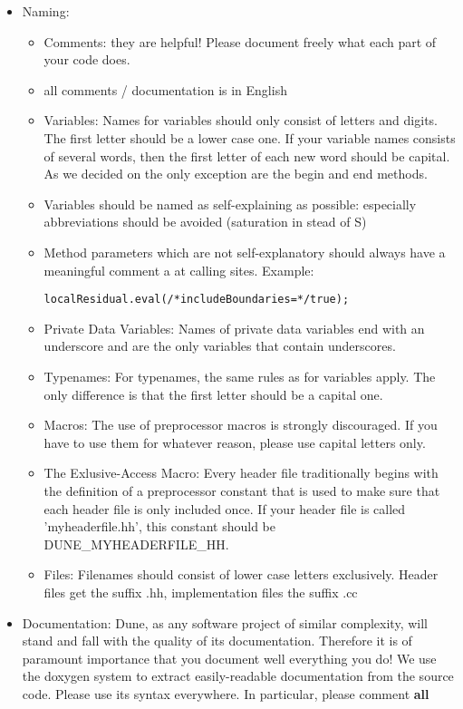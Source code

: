 \begin{itemize}
\item Naming: 
\begin{itemize}
\item Comments: they are helpful! Please document freely what each part of your code does. 
\item all comments / documentation is in English
\item Variables: Names for variables should only consist of letters and digits. The first letter should be a lower case one. If your variable names consists of several words, then the first letter of each new word should be capital. As we decided on the only exception are the begin and end methods.
\item Variables should be named as self-explaining as possible: especially abbreviations should be avoided (saturation in stead of S)
\item Method parameters which are not self-explanatory should always
  have a meaningful comment a at calling sites. Example:
\begin{lstlisting}[style=eWomsCode]
   localResidual.eval(/*includeBoundaries=*/true);
\end{lstlisting}
\item Private Data Variables: Names of private data variables end with an underscore and are the only variables that contain underscores. 
\item Typenames: For typenames, the same rules as for variables apply. The only difference is that the first letter should be a capital one.
\item Macros: The use of preprocessor macros is strongly discouraged. If you have to use them for whatever reason, please use capital letters only.
\item The Exlusive-Access Macro: Every header file traditionally begins with the definition of a preprocessor constant that is used to make sure that each header file is only included once. If your header file is called 'myheaderfile.hh', this constant should be DUNE\_MYHEADERFILE\_HH.
\item Files: Filenames should consist of lower case letters exclusively. Header files get the suffix .hh, implementation files the suffix .cc
\end{itemize}
\item Documentation:
      Dune, as any software project of similar complexity, will stand and fall with the quality of its documentation.
Therefore it is of paramount importance that you document well everything you do! We use the doxygen system to extract easily-readable documentation from the source code. Please use its syntax everywhere. In particular, please comment \textbf{all}

\end{itemize}
